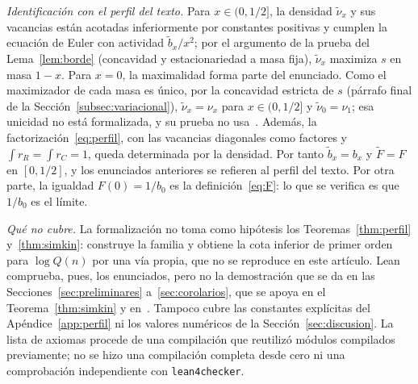 \emph{Identificación con el perfil del texto.} Para $x\in(0,1/2]$, la densidad $\tilde\nu_x$ y
sus vacancias están acotadas inferiormente por constantes positivas y cumplen la ecuación de
Euler con actividad $\tilde b_x/x^2$; por el argumento de la prueba del Lema~\ref{lem:borde}
(concavidad y estacionariedad a masa fija), $\tilde\nu_x$ maximiza $s$ en masa $1-x$. Para
$x=0$, la maximalidad forma parte del enunciado. Como el maximizador de cada masa es único, por
la concavidad estricta de $s$ (párrafo final de la Sección~\ref{subsec:variacional}),
$\tilde\nu_x=\nu_x$ para $x\in(0,1/2]$ y $\tilde\nu_0=\nu_1$; esa unicidad no está formalizada, y
su prueba no usa~\cite{Perfil}. Además, la
factorización~\eqref{eq:perfil}, con las vacancias diagonales como factores y
$\int r_R=\int r_C=1$, queda determinada por la densidad. Por tanto $\tilde b_x=b_x$ y
$\tilde F=F$ en $[0,1/2]$, y los enunciados anteriores se refieren al perfil del texto. Por otra
parte, la igualdad $F(0)=1/b_0$ es la definición~\eqref{eq:F}: lo que se verifica es que $1/b_0$
es el límite.

\emph{Qué no cubre.} La formalización no toma como hipótesis los Teoremas~\ref{thm:perfil}
y~\ref{thm:simkin}: construye la familia y obtiene la cota inferior de primer orden para
$\log Q(n)$ por una vía propia, que no se reproduce en este artículo. Lean comprueba, pues, los
enunciados, pero no la demostración que se da en las Secciones~\ref{sec:preliminares}
a~\ref{sec:corolarios}, que se apoya en el Teorema~\ref{thm:simkin} y en~\cite{Perfil}. Tampoco
cubre las constantes explícitas del Apéndice~\ref{app:perfil} ni los valores numéricos de la
Sección~\ref{sec:discusion}. La lista de axiomas procede de una compilación que reutilizó módulos
compilados previamente; no se hizo una compilación completa desde cero ni una comprobación
independiente con \texttt{lean4checker}.
